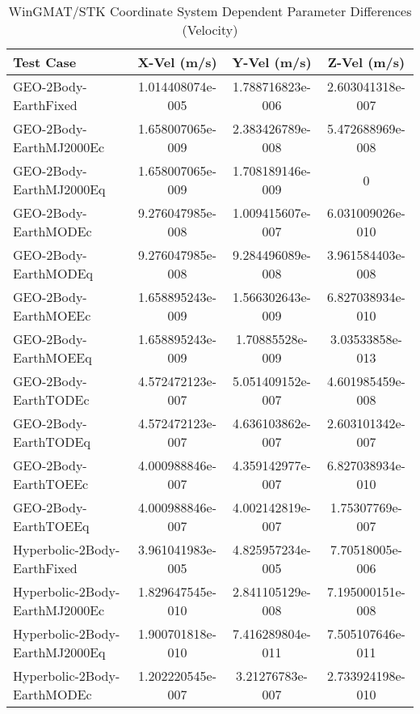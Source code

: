\begin{table}[htbp!]
\centering
\caption{ WinGMAT/STK Coordinate System Dependent Parameter Differences (Velocity)}
      \begin{tabular}{lccc}
      \hline\hline
          Test Case & X-Vel (m/s) & Y-Vel (m/s) & Z-Vel (m/s) \\
         \hline
         GEO-2Body-EarthFixed & 1.014408074e-005 & 1.788716823e-006 & 2.603041318e-007 \\
         GEO-2Body-EarthMJ2000Ec & 1.658007065e-009 & 2.383426789e-008 & 5.472688969e-008 \\
         GEO-2Body-EarthMJ2000Eq & 1.658007065e-009 & 1.708189146e-009 & 0 \\
         GEO-2Body-EarthMODEc & 9.276047985e-008 & 1.009415607e-007 & 6.031009026e-010 \\
         GEO-2Body-EarthMODEq & 9.276047985e-008 & 9.284496089e-008 & 3.961584403e-008 \\
         GEO-2Body-EarthMOEEc & 1.658895243e-009 & 1.566302643e-009 & 6.827038934e-010 \\
         GEO-2Body-EarthMOEEq & 1.658895243e-009 & 1.70885528e-009 & 3.03533858e-013 \\
         GEO-2Body-EarthTODEc & 4.572472123e-007 & 5.051409152e-007 & 4.601985459e-008 \\
         GEO-2Body-EarthTODEq & 4.572472123e-007 & 4.636103862e-007 & 2.603101342e-007 \\
         GEO-2Body-EarthTOEEc & 4.000988846e-007 & 4.359142977e-007 & 6.827038934e-010 \\
         GEO-2Body-EarthTOEEq & 4.000988846e-007 & 4.002142819e-007 & 1.75307769e-007 \\
         Hyperbolic-2Body-EarthFixed & 3.961041983e-005 & 4.825957234e-005 & 7.70518005e-006 \\
         Hyperbolic-2Body-EarthMJ2000Ec & 1.829647545e-010 & 2.841105129e-008 & 7.195000151e-008 \\
         Hyperbolic-2Body-EarthMJ2000Eq & 1.900701818e-010 & 7.416289804e-011 & 7.505107646e-011 \\
         Hyperbolic-2Body-EarthMODEc & 1.202220545e-007 & 3.21276783e-007 & 2.733924198e-010 \\

\end{tabular}
\end{table}
